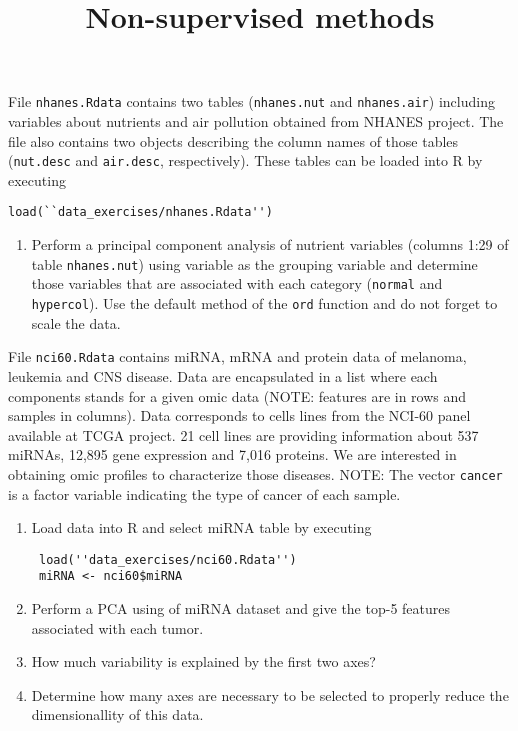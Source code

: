 \documentclass[11pt]{article}
\begin{document}
\title{\bf Non-supervised methods}
\date{}


\maketitle




 File {\tt nhanes.Rdata} contains two tables ({\tt nhanes.nut} and {\tt nhanes.air}) including variables about nutrients and air pollution obtained from NHANES project. The file also contains two objects describing the column names of those tables ({\tt nut.desc} and {\tt air.desc}, respectively). These tables can be loaded into R by executing

\begin{verbatim}
load(``data_exercises/nhanes.Rdata'')
\end{verbatim}

 
\begin{enumerate}
 \item Perform a principal component analysis of nutrient variables (columns 1:29 of table {\tt nhanes.nut}) using variable {\tt } as the grouping variable and determine those variables that are associated with each category ({\tt normal} and {\tt hypercol}). Use the default method of the {\tt ord} function and do not forget to scale the data.
 \end{enumerate}
 
\bigskip


 File {\tt nci60.Rdata} contains miRNA, mRNA and protein data of melanoma, leukemia and CNS disease. Data are encapsulated in a list where each components stands for a given omic data (NOTE: features are in rows and samples in columns). Data corresponds to cells lines from the NCI-60 panel available at TCGA project. 21 cell lines are providing information about 537 miRNAs, 12,895 gene expression and 7,016 proteins. We are interested in obtaining omic profiles to characterize those diseases. NOTE: The vector {\tt cancer} is a factor variable indicating  the type of cancer of each sample.  

 
\begin{enumerate}
 \item Load data into R and select miRNA table by executing
 
 \begin{verbatim}
 load(''data_exercises/nci60.Rdata'')
 miRNA <- nci60$miRNA
 \end{verbatim}
 
 \item Perform a PCA using of miRNA dataset  and give the top-5 features associated with each tumor.
 \item How much variability is explained by the first two axes?
 \item Determine how many axes are necessary to be selected to properly reduce the dimensionallity of this data.
\end{enumerate}
 
\end{document}
